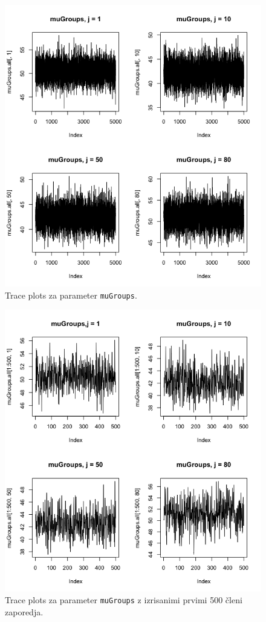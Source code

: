 \documentclass[a4paper,11pt]{article}
\begin{document}
\begin{figure}[ht!]
    \centering
    \includegraphics[width = 150mm]{Slike/2_muGroups.png}
    \caption{Trace plots za parameter \texttt{muGroups}.}
\end{figure}
\newpage
\begin{figure}[ht!]
    \centering
    \includegraphics[width = 150mm]{Slike/2_muGroups_500.png}
    \caption{Trace plots za parameter \texttt{muGroups} z izrisanimi prvimi 500 členi zaporedja.}
\end{figure}
\end{document}
